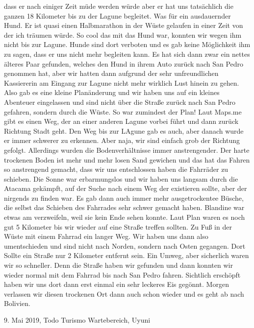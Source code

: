 \documentclass[11pt]{book}
\begin{document}
dass er nach einiger Zeit müde werden würde aber er hat uns tatsächlich die ganzen 18 Kilometer bis zu der Lagune begleitet. Was für ein ausdauernder Hund. 
Er ist quasi einen Halbmarathon in der Wüste gelaufen in einer Zeit von der ich träumen würde. So cool das mit das Hund war, konnten wir wegen ihm nicht 
bis zur Lagune. Hunde sind dort verboten und es gab keine Möglichkeit ihm zu sagen, dass er uns nicht mehr begleiten kann. Es hat sich dann zwar ein 
nettes älteres Paar gefunden, welches den Hund in ihrem Auto zurück nach San Pedro genommen hat, aber wir hatten dann aufgrund der sehr unfreundlichen 
Kassiererin am Eingang zur Lagune nicht mehr wirklich Lust hinein zu gehen. Also gab es eine kleine Planänderung und wir haben uns auf ein kleines Abenteuer 
eingelassen und sind nicht über die Straße zurück nach San Pedro gefahren, sondern durch die Wüste. So war zumindest der Plan! Laut Maps.me gibt es einen 
Weg, der an einer anderen Lagune vorbei führt und dann zurück Richtung Stadt geht. Den Weg bis zur LAgune gab es auch, aber danach wurde er immer schwerer 
zu erkennen. Aber naja, wir sind einfach grob der Richtung gefolgt. Allerdings wurden die Bodenverhältnisse immer anstrengender. Der harte trockenen 
Boden ist mehr und mehr losen Sand gewichen und das hat das Fahren so anstrengend gemacht, dass wir uns entschlossen haben die Fahrräder zu schieben. 
Die Sonne war erbarmungslos und wir haben uns langsam durch die Atacama gekämpft, auf der Suche nach einem Weg der existieren sollte, aber der nirgends 
zu finden war. Es gab dann auch immer mehr ausgetrockentee Büsche, die selbst das Schieben des Fahrrades sehr schwer gemacht haben. Blandine war 
etwas am verzweifeln, weil sie kein Ende sehen konnte. Laut Plan waren es noch gut 5 Kilometer bis wir wieder auf eine Straße treffen sollten. Zu Fuß in der 
Wüste mit einem Fahrrad ein langer Weg. Wir haben uns dann also umentschieden und sind nicht nach Norden, sondern nach Osten gegangen. Dort Sollte ein 
Straße nur 2 Kilometer entfernt sein. Ein Umweg, aber sicherlich waren wir so schneller. Denn die Straße haben wir gefunden und dann konnten wir wieder normal 
mit dem Fahrrad bis nach San Pedro fahren. Sichtlich erschöpft haben wir uns dort dann erst einmal ein sehr leckeres Eis gegönnt. 
Morgen verlassen wir diesen trockenen Ort dann auch schon wieder und es geht ab nach Bolivien. 

9. Mai 2019, Todo Turismo Wartebereich, Uyuni
\end{document}
